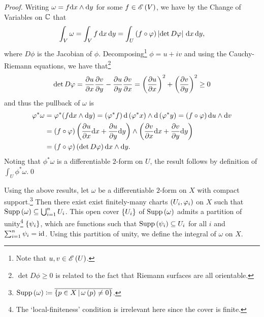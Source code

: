 \documentclass[../Moduli_Spaces_of_Riemann_Surfaces.tex]{subfiles}
\begin{document}
    \begin{proof}
        Writing $\omega=f\mathrm{d} x\wedge\mathrm{d} y$ for some $f\in\mathscr{E}\left(V\right)$, we have by the Change of Variables on $\mathbb{C}$ that
        \begin{equation*}
            \int_V\omega=\int_Vf\,\mathrm{d} x\,\mathrm{d} y=\int_U\left(f\circ\varphi\right)\left|\det D\varphi\right|\,\mathrm{d} x\,\mathrm{d} y,
        \end{equation*}
        where $D\phi$ is the Jacobian of $\phi$. Decomposing\footnote{Note that $u,v\in\mathscr{E}\left(U\right)$.} $\phi=u+iv$ and using the Cauchy-Riemann equations, we have that\footnote{$\det D\phi\geq0$ is related to the fact that Riemann surfaces are all orientable.}
        \begin{equation*}
            \det D\varphi=\frac{\partial u}{\partial x}\frac{\partial v}{\partial y}-\frac{\partial u}{\partial y}\frac{\partial v}{\partial x}=\left(\frac{\partial u}{\partial x}\right)^2+\left(\frac{\partial v}{\partial y}\right)^2\geq0
        \end{equation*}
        and thus the pullback of $\omega$ is
        \begin{equation*}
            \begin{aligned}
                \varphi^\ast\omega&=\varphi^\ast\!\left(f\mathrm{d} x\wedge\mathrm{d} y\right)=\left(\varphi^\ast f\right)\mathrm{d}\left(\varphi^\ast x\right)\wedge\mathrm{d}\left(\varphi^\ast y\right)=\left(f\circ\varphi\right)\mathrm{d} u\wedge \mathrm{d} v \\
                               &=\left(f\circ\varphi\right)\left(\frac{\partial u}{\partial x}\mathrm{d} x+\frac{\partial u}{\partial y}\mathrm{d} y\right)\wedge\left(\frac{\partial v}{\partial x}\mathrm{d} x+\frac{\partial v}{\partial y}\mathrm{d} y\right) \\
                               &=\left(f\circ\varphi\right)\left(\det D\varphi\right)\mathrm{d} x\wedge\mathrm{d} y.
            \end{aligned}
        \end{equation*}
        Noting that $\phi^\ast\omega$ is a differentiable $2$-form on $U$, the result follows by definition of $\int_U\phi^\ast\omega$.\qed
    \end{proof}
    Using the above results, let $\omega$ be a differentiable $2$-form on $X$ with compact support.\footnote{$\operatorname{Supp}\left(\omega\right)\coloneqq\overline{\left\{p\in X\,\middle\vert\,\omega\left(p\right)\neq0\right\}}$.} Then there exist exist finitely-many charts $\left(U_i,\varphi_i\right)$ on $X$ such that $\operatorname{Supp}\left(\omega\right)\subseteq\bigcup_{i=1}^{n}U_i$. This open cover $\left\{U_i\right\}$ of $\operatorname{Supp}\left(\omega\right)$ admits a partition of unity\footnote{The `local-finiteness' condition is irrelevant here since the cover is finite.} $\left\{\psi_i\right\}$, which are functions such that $\operatorname{Supp}\left(\psi_i\right)\subseteq U_i$ for all $i$ and $\sum_{i=1}^n\psi_i=\operatorname{id}$. Using this partition of unity, we define the integral of $\omega$ on $X$.
\end{document}
